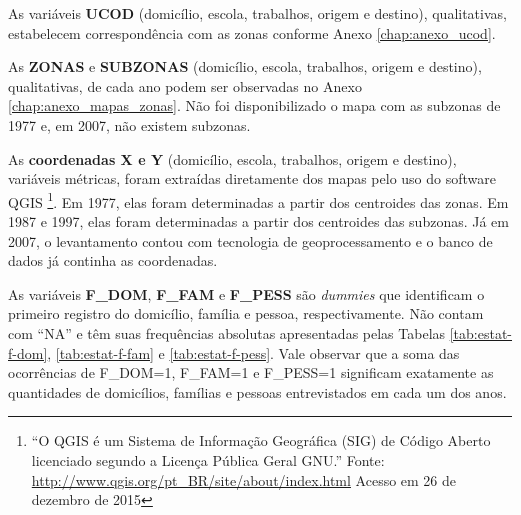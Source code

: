 \newpage
As variáveis \textbf{UCOD} (domicílio, escola, trabalhos, origem e destino), qualitativas, estabelecem correspondência com as zonas conforme Anexo \ref{chap:anexo_ucod}.

As \textbf{ZONAS} e \textbf{SUBZONAS} (domicílio, escola, trabalhos, origem e destino), qualitativas, de cada ano podem ser observadas no Anexo \ref{chap:anexo_mapas_zonas}. Não foi disponibilizado o mapa com as subzonas de 1977 e, em 2007, não existem subzonas.

As \textbf{coordenadas X e Y} (domicílio, escola, trabalhos, origem e destino), variáveis métricas, foram extraídas diretamente dos mapas pelo uso do software QGIS \footnote{``O QGIS é um Sistema de Informação Geográfica (SIG) de Código Aberto licenciado segundo a Licença Pública Geral GNU.'' Fonte: \url{http://www.qgis.org/pt_BR/site/about/index.html} Acesso em 26 de dezembro de 2015}. Em 1977, elas foram determinadas a partir dos centroides das zonas. Em 1987 e 1997, elas foram determinadas a partir dos centroides das subzonas. Já em 2007, o levantamento contou com tecnologia de geoprocessamento e o banco de dados já continha as coordenadas.

As variáveis \textbf{F_DOM}, \textbf{F_FAM} e \textbf{F_PESS} são \textit{dummies} que identificam o primeiro registro do domicílio, família e pessoa, respectivamente. Não contam com ``NA'' e têm suas frequências absolutas apresentadas pelas Tabelas \ref{tab:estat-f-dom}, \ref{tab:estat-f-fam} e \ref{tab:estat-f-pess}. Vale observar que a soma das ocorrências de F_DOM=1, F_FAM=1 e F_PESS=1 significam exatamente as quantidades de domicílios, famílias e pessoas entrevistados em cada um dos anos.

\begin{table}[htb]
\centering

\end{table}


